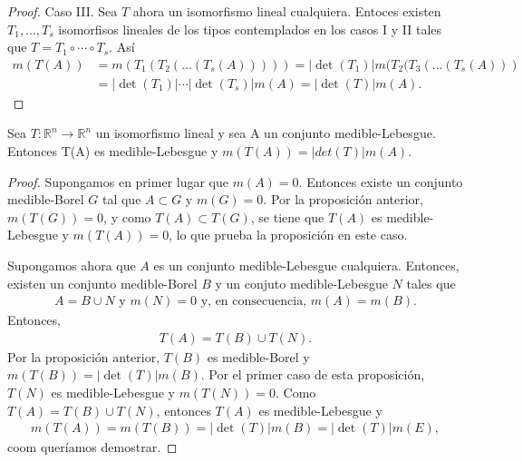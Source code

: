 \begin{proof}
    Caso III. Sea $T$ ahora un isomorfismo lineal cualquiera. Entoces existen $T_1,...,T_s$ isomorfisos lineales de los tipos contemplados en los casos I y II tales que  $T = T_1 \circ \cdots \circ T_s$. Así
    \begin{align*}
        m(T(A)) & = m(T_1(T_2(...(T_s(A))))) = |\det(T_1)|m(T_2(T_3(...(T_s(A))) \\
                & = |\det(T_1)| \cdots |\det(T_s)|m(A) = |\det(T)|m(A).
    \end{align*}
\end{proof}

\begin{prop}
    Sea $T: \mathbb{R}^n \longrightarrow \mathbb{R}^n$ un isomorfismo lineal y sea A un conjunto medible-Lebesgue. Entonces T(A) es medible-Lebesgue y $m(T(A)) = |det(T)|m(A)$.
\end{prop}

\begin{proof}
    Supongamos en primer lugar que $m(A) = 0$. Entonces existe un conjunto medible-Borel $G$ tal que $A \subset G$ y $m(G) = 0$. Por la proposición anterior, $m(T(G)) = 0$, y como $T(A) \subset T(G)$, se tiene que $T(A)$ es medible-Lebesgue y $m(T(A)) = 0$, lo que prueba la proposición en este caso.

    Supongamos ahora que $A$ es un conjunto medible-Lebesgue cualquiera. Entonces, existen un conjunto medible-Borel $B$ y un conjuto medible-Lebesgue $N$ tales que
    \begin{align*}
        A = B \cup N \text{ y } m(N) = 0 \text{ y, en consecuencia, } m(A) = m(B).
    \end{align*}
    Entonces,
    \begin{align*}
        T(A) = T(B) \cup T(N).
    \end{align*}
    Por la proposición anterior, $T(B)$ es medible-Borel y $m(T(B)) = |\det(T)|m(B)$. Por el primer caso de esta proposición, $T(N)$ es medible-Lebesgue y $m(T(N)) = 0$. Como $T(A) = T(B) \cup T(N)$, entonces $T(A)$ es medible-Lebesgue y
    \begin{align*}
        m(T(A)) = m(T(B)) = |\det(T)|m(B) = |\det(T)|m(E),
    \end{align*}
    coom queríamos demostrar.
\end{proof}

